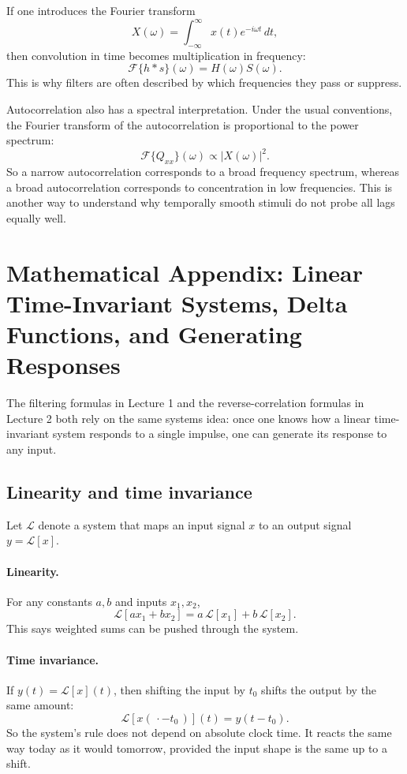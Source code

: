 \documentclass[11pt]{article}
\begin{document}
If one introduces the Fourier transform
\[
X(\omega)=\int_{-\infty}^{\infty} x(t)e^{-i\omega t}\,dt,
\]
then convolution in time becomes multiplication in frequency:
\[
\mathcal{F}\{h*s\}(\omega)=H(\omega)S(\omega).
\]
This is why filters are often described by which frequencies they pass or suppress.

Autocorrelation also has a spectral interpretation. Under the usual conventions, the Fourier transform of the autocorrelation is proportional to the power spectrum:
\[
\mathcal{F}\{Q_{xx}\}(\omega)\propto |X(\omega)|^2.
\]
So a narrow autocorrelation corresponds to a broad frequency spectrum, whereas a broad autocorrelation corresponds to concentration in low frequencies. This is another way to understand why temporally smooth stimuli do not probe all lags equally well.

\section{Mathematical Appendix: Linear Time-Invariant Systems, Delta Functions, and Generating Responses}

The filtering formulas in Lecture 1 and the reverse-correlation formulas in Lecture 2 both rely on the same systems idea: once one knows how a linear time-invariant system responds to a single impulse, one can generate its response to any input.

\subsection{Linearity and time invariance}

Let $\mathcal{L}$ denote a system that maps an input signal $x$ to an output signal $y=\mathcal{L}[x]$.

\paragraph{Linearity.}
For any constants $a,b$ and inputs $x_1,x_2$,
\[
\mathcal{L}[a x_1 + b x_2] = a\,\mathcal{L}[x_1] + b\,\mathcal{L}[x_2].
\]
This says weighted sums can be pushed through the system.

\paragraph{Time invariance.}
If $y(t)=\mathcal{L}[x](t)$, then shifting the input by $t_0$ shifts the output by the same amount:
\[
\mathcal{L}[x(\,\cdot - t_0\,)](t)=y(t-t_0).
\]
So the system's rule does not depend on absolute clock time. It reacts the same way today as it would tomorrow, provided the input shape is the same up to a shift.
\end{document}
